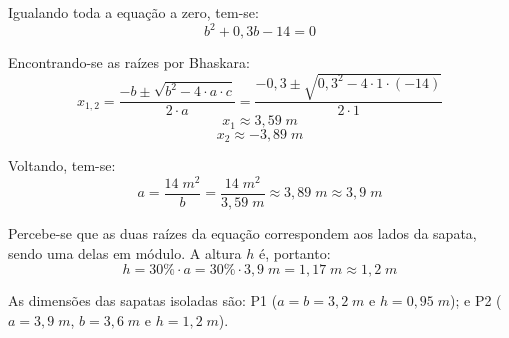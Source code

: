 Igualando toda a equação a zero, tem-se:
$$b^2+0,3b-14=0$$

Encontrando-se as raízes por Bhaskara:
$$x_{1, 2}=\frac{-b\pm\sqrt{b^2-4\cdot a\cdot c}}{2\cdot a}=\frac{-0,3\pm\sqrt{0,3^2-4\cdot 1\cdot (-14)}}{2\cdot1}$$
$$x_1\approx3,59\;m$$
$$x_2\approx-3,89\;m$$

Voltando, tem-se:
$$a=\frac{14\;m^2}{b}=\frac{14\;m^2}{3,59\;m}\approx3,89\;m\approx3,9\;m$$

Percebe-se que as duas raízes da equação correspondem aos lados da sapata, sendo uma delas em módulo. A altura $h$ é, portanto:
$$h=30\%\cdot a=30\%\cdot 3,9\;m=1,17\;m\approx1,2\;m$$

As dimensões das sapatas isoladas são: P1 ($a=b=3,2\;m$ e $h=0,95\;m$); e P2 ($a=3,9\;m$, $b=3,6\;m$ e $h=1,2\;m$).
